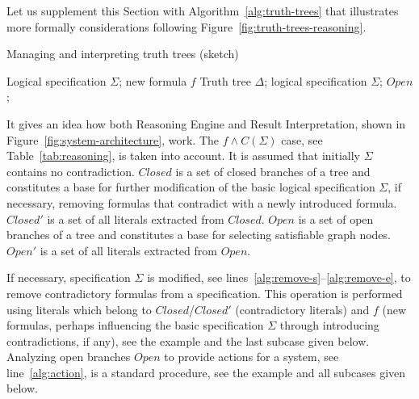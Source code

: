 \documentclass[runningheads,a4paper]{llncs}
\newcommand{\con}{\wedge} \newcommand{\dis}{\vee} \newcommand{\alw}{\Box} \newcommand{\imp}{\Rightarrow} \newcommand{\equ}{\Leftrightarrow} \newcommand{\som}{\Diamond} \newcommand{\nex}{\raisebox{0.2em}{\scriptsize $\bigcirc$}}
\begin{document}
Let us supplement this Section with Algorithm~\ref{alg:truth-trees}
that illustrates more formally considerations following Figure~\ref{fig:truth-trees-reasoning}.
\begin{algorithm}[htb]
\caption{Managing and interpreting truth trees (sketch)}
\label{alg:truth-trees}
{\normalsize
\begin{algorithmic}[1]
\algrenewcommand{}
\algrenewcommand{}
\Require Logical specification $\Sigma$; new formula $f$
\Ensure Truth tree $\Delta$; logical specification $\Sigma$; $Open$;
\State{Build truth tree $\Delta$ for a combined formula $f \con C(L)$;}
\label{alg:remove-s}
\label{alg:remove-e}
\label{alg:action}
\end{algorithmic}
}
\end{algorithm}
It gives an idea how both Reasoning Engine and Result Interpretation,
shown in Figure~\ref{fig:system-architecture},
work.
The $f \con C(\Sigma)$ case,
see Table~\ref{tab:reasoning},
is taken into account.
It is assumed that initially $\Sigma$ contains no contradiction.
$Closed$ is a set of closed branches of a tree and constitutes a base for further modification of
the basic logical specification $\Sigma$,
if necessary,
removing formulas that contradict with a newly introduced formula.
$Closed'$ is a set of all literals extracted from $Closed$.
$Open$ is a set of open branches of a tree and constitutes a base for selecting satisfiable graph nodes.
$Open'$ is a set of all literals extracted from $Open$.

If necessary,
specification $\Sigma$ is modified,
see lines~\ref{alg:remove-s}--\ref{alg:remove-e},
to remove contradictory formulas from a specification.
This operation is performed using literals which belong to $Closed$/$Closed'$ (contradictory literals)
and $f$ (new formulas, perhaps influencing the basic specification $\Sigma$ through introducing contradictions, if any),
see the example and the last subcase given below.
Analyzing open branches $Open$ to provide actions for a system,
see line~\ref{alg:action},
is a standard procedure,
see the example and all subcases given below.
\end{document}
